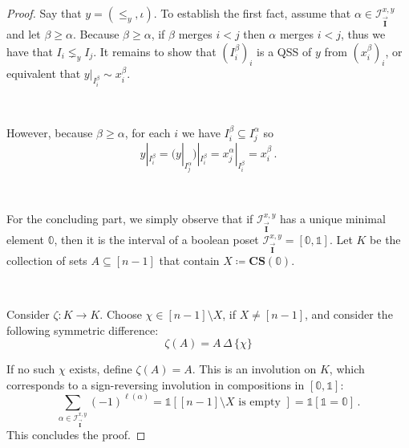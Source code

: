 \documentclass[12pt, reqno]{amsart}
\theoremstyle{definition}
\newcommand{\III}{\vec{\mathbf{I}}}
\begin{document}
\begin{proof}
Say that $y = (\leq_y, \iota)$.
To establish the first fact, assume that $\alpha \in \mathcal I^{x, y}_{\III}$ and let $\beta \geq \alpha $.
Because $\beta \geq \alpha$, if $\beta $ merges $i < j$ then $\alpha $ merges $i < j$, thus we have that $I_i \lneq_y I_j$.
It remains to show that $(I^{\beta}_i)_i$ is a QSS of $y$ from $(x^{\beta}_i )_i$, or equivalent that $y|_{I_i^{\beta}} \sim x_i^{\beta}$.

\

However, because $\beta \geq \alpha$, for each $i$ we have $I^{\beta}_i \subseteq I^{\alpha}_j$ so 
\[y|_{I^{\beta}_i} = {\Big(}y|_{I^{\alpha}_j}{\Big )}|_{I^{\beta}_i} =x^{\alpha}_j |_{I^{\beta}_i} = x^{\beta}_i \, .\]

\

For the concluding part, we simply observe that if $\mathcal I^{x, y}_{\III}$ has a unique minimal element $\mathbb{0}$, then it is the interval of a boolean poset $\mathcal I^{x, y}_{\III} = [\mathbb{0}, \mathbb{1}]$.
Let $K $ be the collection of sets $A \subseteq [n-1]$ that contain $X \coloneqq \mathbf{CS}(\mathbb{0})$.

\

Consider $\zeta: K \to K$.
Choose $\chi \in [n-1] \setminus X$, if $X \neq [n-1]$, and consider the following symmetric difference:
\[\zeta (A) = A \,\Delta\, \{ \chi \}\]

If no such $\chi $ exists, define $\zeta(A) = A$.
This is an involution on $K$, %
which corresponds to a sign-reversing involution in compositions in $[\mathbb{0} , \mathbb{1}]$:
$$\sum_{\alpha \in \mathcal I^{x, y}_{\III}} (-1)^{\ell(\alpha)} =  \mathbb{1}[[n-1] \setminus X \text{ is empty } ] = \mathbb{1}[\mathbb{1} = \mathbb{0}] \, .$$
This concludes the proof.
\end{proof}


\end{document}
